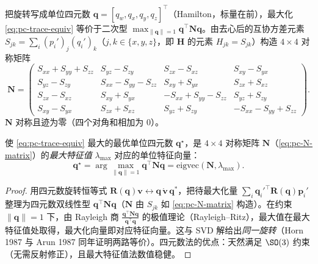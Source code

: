 \begin{derivation}
把旋转写成单位四元数 $\mathbf{q}=[q_w,q_x,q_y,q_z]^\top$（Hamilton，标量在前），最大化 \cref{eq:pc-trace-equiv} 等价于二次型 $\max_{\|\mathbf{q}\|=1}\mathbf{q}^\top\mathbf{N}\mathbf{q}$。由去心后的互协方差元素 $S_{jk}=\sum_i(p_i')_j(q_i')_k$（$j,k\in\{x,y,z\}$，即 $\mathbf{H}$ 的元素 $H_{jk}=S_{jk}$）构造 $4\times4$ 对称矩阵
\begin{equation}
  \mathbf{N}=\begin{pmatrix}
  S_{xx}+S_{yy}+S_{zz} & S_{yz}-S_{zy} & S_{zx}-S_{xz} & S_{xy}-S_{yx}\\
  S_{yz}-S_{zy} & S_{xx}-S_{yy}-S_{zz} & S_{xy}+S_{yx} & S_{zx}+S_{xz}\\
  S_{zx}-S_{xz} & S_{xy}+S_{yx} & -S_{xx}+S_{yy}-S_{zz} & S_{yz}+S_{zy}\\
  S_{xy}-S_{yx} & S_{zx}+S_{xz} & S_{yz}+S_{zy} & -S_{xx}-S_{yy}+S_{zz}
  \end{pmatrix}.
  \label{eq:pc-N-matrix}
\end{equation}
$\mathbf{N}$ 对称且迹为零（四个对角和相加为 $0$）。
\end{derivation}

\begin{theorem}\label{thm:pc-horn}
使 \cref{eq:pc-trace-equiv} 最大的最优单位四元数 $\mathbf{q}^\star$，是 $4\times4$ 对称矩阵 $\mathbf{N}$（\cref{eq:pc-N-matrix}）的\emph{最大特征值} $\lambda_{\max}$ 对应的单位特征向量：
\begin{equation}
  \mathbf{q}^\star=\arg\max_{\|\mathbf{q}\|=1}\mathbf{q}^\top\mathbf{N}\mathbf{q}=\mathrm{eigvec}(\mathbf{N},\lambda_{\max}).
  \label{eq:pc-q-star}
\end{equation}
\end{theorem}

\begin{proof}
用四元数旋转恒等式 $\mathbf{R}(\mathbf{q})\mathbf{v}\leftrightarrow\mathbf{q}\,\mathring{\mathbf{v}}\,\mathbf{q}^\ast$，把待最大化量 $\sum_i\mathbf{q}_i'^\top\mathbf{R}(\mathbf{q})\mathbf{p}_i'$ 整理为四元数双线性型 $\mathbf{q}^\top\mathbf{N}\mathbf{q}$（$\mathbf{N}$ 由 $S_{jk}$ 如 \cref{eq:pc-N-matrix} 构造）。在约束 $\|\mathbf{q}\|=1$ 下，由 Rayleigh 商 $\frac{\mathbf{q}^\top\mathbf{N}\mathbf{q}}{\mathbf{q}^\top\mathbf{q}}$ 的极值理论（Rayleigh--Ritz），最大值在最大特征值处取得，最大化向量即对应特征向量。这与 SVD 解给出\emph{同一旋转}（Horn 1987 与 Arun 1987 同年证明两路等价）。四元数法的优点：天然满足 $\SO(3)$ 约束（无需反射修正），且最大特征值法数值稳健。
\end{proof}

